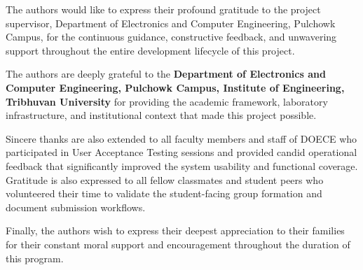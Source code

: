 The authors would like to express their profound gratitude to the project supervisor, Department of Electronics and Computer Engineering, Pulchowk Campus, for the continuous guidance, constructive feedback, and unwavering support throughout the entire development lifecycle of this project.

The authors are deeply grateful to the \textbf{Department of Electronics and Computer Engineering, Pulchowk Campus, Institute of Engineering, Tribhuvan University} for providing the academic framework, laboratory infrastructure, and institutional context that made this project possible.

Sincere thanks are also extended to all faculty members and staff of DOECE who participated in User Acceptance Testing sessions and provided candid operational feedback that significantly improved the system usability and functional coverage. Gratitude is also expressed to all fellow classmates and student peers who volunteered their time to validate the student-facing group formation and document submission workflows.

Finally, the authors wish to express their deepest appreciation to their families for their constant moral support and encouragement throughout the duration of this program.
